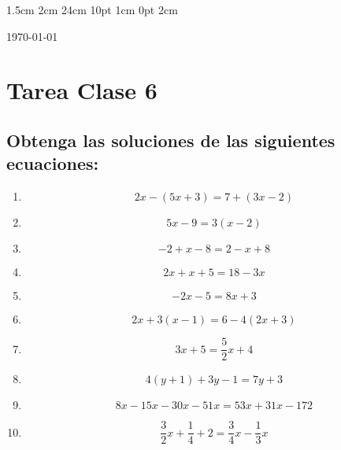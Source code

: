 \documentclass[12pt,letterpaper]{report}
\begin{document}
\setmargins{2.5cm}      
{1.5cm}                     
{2cm}  
{24cm}                    
{10pt}                          
{1cm}                          
{0pt}                             
{2cm}
\begin{flushright}
\today
\end{flushright}
\vspace{-1.75cm}
\section*{Tarea Clase 6}
\subsection*{Obtenga las soluciones de las siguientes ecuaciones:}
\begin{enumerate}
\item \begin{equation*}
    2x-(5x+3)=7+(3x-2)
\end{equation*}
\item \begin{equation*}
    5x-9=3(x-2)
\end{equation*}
\item \begin{equation*}
    -2+x-8=2-x+8
\end{equation*}
\item \begin{equation*}
    2x+x+5=18-3x
\end{equation*}
\item \begin{equation*}
    -2x-5=8x+3
\end{equation*}
\item \begin{equation*}
    2x+3(x-1)=6-4(2x+3)
\end{equation*}
\item \begin{equation*}
    3x+5=\frac{5}{2}x+4
\end{equation*}
\item \begin{equation*}
    4(y+1)+3y-1=7y+3
\end{equation*}
\item \begin{equation*}
    8x-15x-30x-51x=53x+31x-172
\end{equation*}
\item \begin{equation*}
    \frac{3}{2}x+\frac{1}{4}+2=\frac{3}{4}x-\frac{1}{3}x

\end{equation*}
\end{enumerate}
\end{document}
